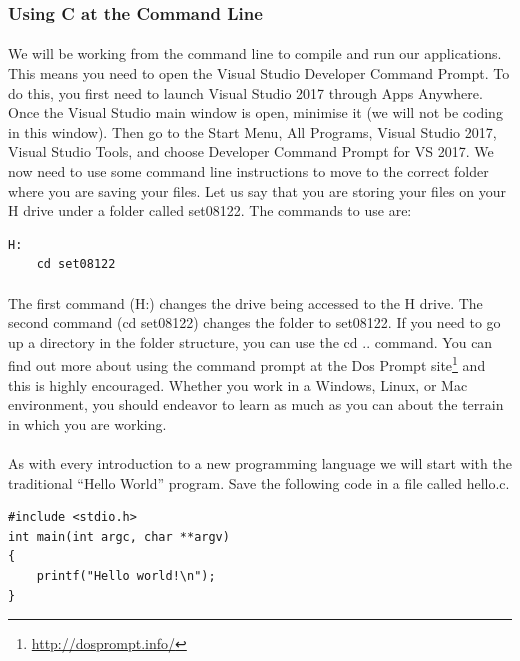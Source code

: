 \documentclass[10pt, a4paper, twosize]{article}
\begin{document}
\subsubsection{Using C at the Command Line}
\paragraph{} We will be working from the command line to compile and run our applications. This means you need to open the Visual Studio Developer Command Prompt. To do this, you first need to launch Visual Studio 2017 through Apps Anywhere. Once the Visual Studio main window is open, minimise it (we will not be coding in this window). Then go to the Start Menu, All Programs, Visual Studio 2017, Visual Studio Tools, and choose Developer Command Prompt for VS 2017.
We now need to use some command line instructions to move to the correct folder where you are saving your files. Let us say that you are storing your files on your H drive under a folder called set08122. The commands to use are:

\begin{lstlisting}[style=DOS]
    H:
    cd set08122
\end{lstlisting}

\paragraph{} The first command (H:) changes the drive being accessed to the H drive. The second command (cd set08122) changes the folder to set08122. If you need to go up a directory in the folder structure, you can use the cd .. command. You can find out more about using the command prompt at the Dos Prompt site\footnote{\url{http://dosprompt.info/}} and this is highly encouraged. Whether you work in a Windows, Linux, or Mac environment, you should endeavor to learn as much as you can about the terrain in which you are working.

\paragraph{} As with every introduction to a new programming language we will start with the traditional ``Hello World'' program. Save the following code in a file called hello.c. 

\begin{lstlisting}
#include <stdio.h>
int main(int argc, char **argv) 
{
    printf("Hello world!\n");
}
\end{lstlisting}
\end{document}
